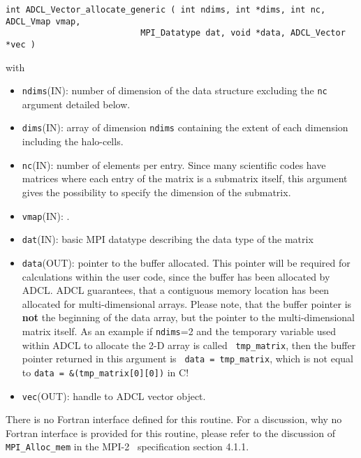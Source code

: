 \begin{verbatim}
int ADCL_Vector_allocate_generic ( int ndims, int *dims, int nc, ADCL_Vmap vmap,
                           MPI_Datatype dat, void *data, ADCL_Vector *vec )

\end{verbatim}
with
\begin{itemize}
\item {\tt ndims}(IN): number of dimension of the data structure excluding the
  {\tt nc} argument detailed below.
\item {\tt dims}(IN): array of dimension {\tt ndims} containing the extent of
  each dimension including the halo-cells.
\item {\tt nc}(IN): number of elements per entry. Since many scientific codes
  have matrices where each entry of the matrix is a submatrix itself, this
  argument gives the possibility to specify the dimension of the submatrix.
\item {\tt vmap}(IN): .
\item {\tt dat}(IN): basic MPI datatype describing the data type of the matrix
\item {\tt data}(OUT): pointer to the buffer allocated. This pointer will be
  required for calculations within the user code, since the buffer has been
  allocated by ADCL. ADCL guarantees, that a contiguous memory location has
  been allocated for multi-dimensional arrays. Please note, that the buffer
  pointer is {\bf not} the beginning of the data array, but the pointer to the
  multi-dimensional matrix itself. As an example if {\tt ndims}=2 and the
  temporary variable used within ADCL to allocate the 2-D array is called {\tt
    tmp\_matrix}, then the buffer pointer returned in this argument is {\tt
    data = tmp\_matrix}, which is not equal to {\tt data =
    \&(tmp\_matrix[0][0])} in C!
\item {\tt vec}(OUT): handle to ADCL vector object.
\end{itemize}
There is no Fortran interface defined for this routine. For a discussion, why
no Fortran interface is provided for this routine, please refer to the
discussion of {\tt MPI\_Alloc\_mem} in the MPI-2~\cite{mpi2} specification
section 4.1.1.

